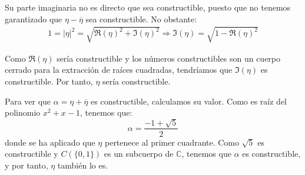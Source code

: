 \begin{ejercicio}
    Su parte imaginaria no es directo que sea constructible, puesto que no tenemos garantizado que $\eta-\overline{\eta}$ sea constructible. No obstante:
    \begin{align*}
        1=|\eta|^2 = \sqrt{\Re(\eta)^2 + \Im(\eta)^2} \Longrightarrow \Im(\eta) = \sqrt{1-\Re(\eta)^2}
    \end{align*}

    Como $\Re(\eta)$ sería constructible y los números constructibles son un cuerpo cerrado para la extracción de raíces cuadradas, tendríamos que $\Im(\eta)$ es constructible. Por tanto, $\eta$ sería constructible.

    Para ver que $\alpha = \eta+\overline{\eta}$ es constructible, calculamos su valor. Como es raíz del polinomio $x^2+x-1$, tenemos que:
    \begin{equation*}
        \alpha = \dfrac{-1 + \sqrt{5}}{2}
    \end{equation*}
    donde se ha aplicado que $\eta$ pertenece al primer cuadrante. Como $\sqrt{5}$ es constructible y $C(\{0,1\})$ es un subcuerpo de $\mathbb{C}$, tenemos que $\alpha$ es constructible, y por tanto, $\eta$ también lo es.
\end{ejercicio}

